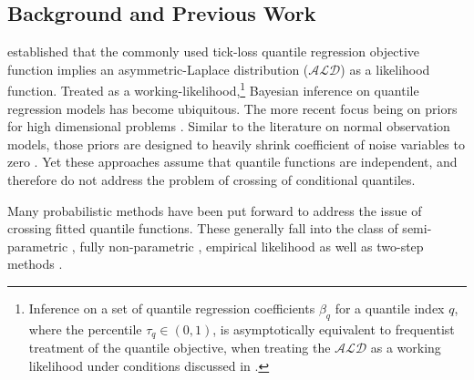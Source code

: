 \subsection{Background and Previous Work} \label{subsec:background}
\citet{yu2001bayesian} established that the commonly used tick-loss quantile regression objective function implies an asymmetric-Laplace distribution ($\mathcal{ALD}$) \citep{kotz2001asymmetric} as a likelihood function. Treated as a working-likelihood,\footnote{Inference on a set of quantile regression coefficients $\beta_q$ for a quantile index $q$, where the percentile $\tau_q \in (0,1)$, is asymptotically equivalent to frequentist treatment of the quantile objective, when treating the $\mathcal{ALD}$ as a working likelihood under conditions discussed in \citet{sriram2013posterior}.} Bayesian inference on quantile regression models has become ubiquitous. The more recent focus being on priors for high dimensional problems \citep{kohns2024horseshoe,alhamzawi2015model,li2010bayesian}. Similar to the literature on normal observation models, those priors are designed to heavily shrink coefficient of noise variables to zero \citep{polson2010shrink}. Yet  these approaches assume that quantile functions are independent, and therefore do not  address the problem of crossing of conditional quantiles.

%
Many probabilistic methods have been put forward to address the issue of crossing fitted quantile functions. These generally fall into the class of semi-parametric \citep{reich2011bayesian,reich2012spatiotemporal,reich2013bayesian,kottas2001bayesian,yang2017joint}, fully non-parametric \citep{scaccia2003bayesian,taddy2010bayesian}, empirical likelihood \citep{lancaster2010bayesian,yang2012bayesian,yang2015quantile} as well as two-step methods \citep{reich2013bayesian,rodrigues2017regression}. 
%

